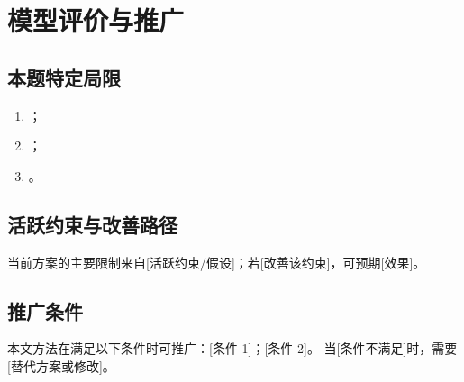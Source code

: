 \section{模型评价与推广}


\subsection{本题特定局限}


\begin{enumerate}
  \item [针对本题的局限 1，说明其影响范围和程度]；
  \item [针对本题的局限 2]；
  \item [哪些假设在实际场景中可能不成立]。
\end{enumerate}

\subsection{活跃约束与改善路径}


当前方案的主要限制来自[活跃约束/假设]；若[改善该约束]，可预期[效果]。

\subsection{推广条件}


本文方法在满足以下条件时可推广：[条件 1]；[条件 2]。
当[条件不满足]时，需要[替代方案或修改]。
